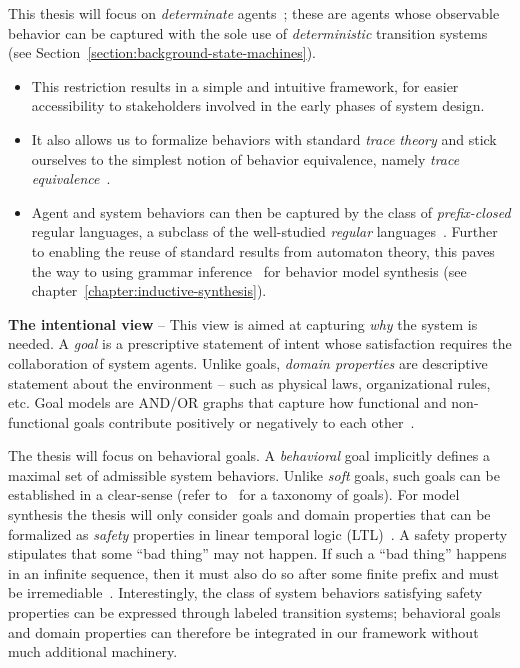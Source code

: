 This thesis will focus on \emph{determinate} agents~\cite{Engelfriet:1985}; these are agents whose observable behavior can be captured with the sole use of \emph{deterministic} transition systems (see Section~\ref{section:background-state-machines}).
\begin{itemize} 
\item This restriction results in a simple and intuitive framework, for easier accessibility to stakeholders involved in the early phases of system design. 
\item It also allows us to formalize behaviors with standard \emph{trace theory} \cite{Hoare:1985} and stick ourselves to the simplest notion of behavior equivalence, namely \emph{trace equivalence}~\cite{Engelfriet:1985}. 
\item Agent and system behaviors can then be captured by the class of \emph{prefix-closed} regular languages, a subclass of the well-studied \emph{regular} languages~\cite{Hopcroft:1979, Aho:1986}. Further to enabling the reuse of standard results from automaton theory, this paves the way to using grammar inference~\cite{Gold:1978} for behavior model synthesis (see chapter~\ref{chapter:inductive-synthesis}). 
\end{itemize}


\noindent \textbf{The intentional view} -- This view is aimed at capturing \emph{why} the system is needed. A \emph{goal} is a prescriptive statement of intent whose satisfaction requires the collaboration of system agents. Unlike goals, \emph{domain properties} are descriptive statement about the environment -- such as physical laws, organizational rules, etc. Goal models are AND/OR graphs that capture how functional and non-functional goals contribute positively or negatively to each other~\cite{VanLamsweerde:2000, VanLamsweerde:2004}.

The thesis will focus on behavioral goals. A \emph{behavioral} goal implicitly defines a maximal set of admissible system behaviors. Unlike \emph{soft} goals, such goals can be established in a clear-sense (refer to~\cite{VanLamsweerde:2009} for a taxonomy of goals). For model synthesis the thesis will only consider goals and domain properties that can be formalized as \emph{safety} properties in linear temporal logic (LTL)~\cite{Manna:1992}. A safety property stipulates that some ``bad thing'' may not happen. If such a ``bad thing'' happens in an infinite sequence, then it must also do so after some finite prefix and must be irremediable~\cite{Alpern:1986, Giannakopoulou:1999}. Interestingly, the class of system behaviors satisfying safety properties can be expressed through labeled transition systems; behavioral goals and domain properties can therefore be integrated in our framework without much additional machinery.

